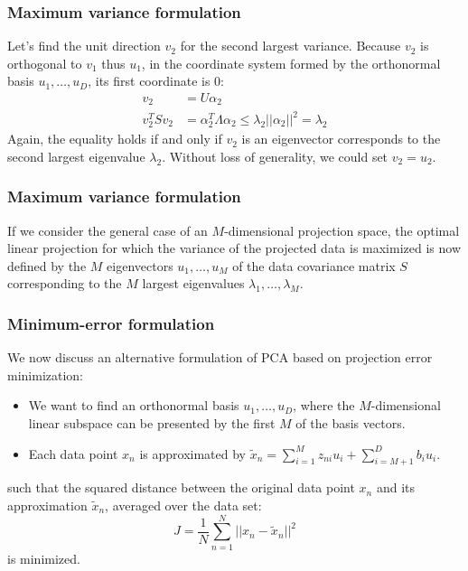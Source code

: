 \documentclass{beamer}
\begin{document}
\begin{frame}
    \frametitle{Maximum variance formulation}
    Let's find the unit direction $v_{2}$ for the second largest variance. Because $v_{2}$ is orthogonal to $v_{1}$ thus $u_{1}$, in the coordinate system formed by the orthonormal basis $u_{1},\hdots,u_{D}$, its first coordinate is $0$:
    \begin{align*}
        v_{2}&=U\alpha_{2} \\
        v_{2}^{T}Sv_{2}&=\alpha_{2}^{T}\Lambda\alpha_{2}\le\lambda_{2}||\alpha_{2}||^{2}=\lambda_{2}
    \end{align*}
    Again, the equality holds if and only if $v_{2}$ is an eigenvector corresponds to the second largest eigenvalue $\lambda_{2}$. Without loss of generality, we could set $v_{2}=u_{2}$.
\end{frame}

\begin{frame}
    \frametitle{Maximum variance formulation}
    If we consider the general case of an $M$-dimensional projection space, the optimal linear projection for which the variance of the projected data is maximized is now defined by the $M$ eigenvectors $u_{1},\hdots,u_{M}$ of the data covariance matrix $S$ corresponding to the $M$ largest eigenvalues $\lambda_{1},\hdots,\lambda_{M}$.
\end{frame}

\begin{frame}
    \frametitle{Minimum-error formulation}
    We now discuss an alternative formulation of PCA based on projection error minimization:
    \begin{itemize}
        \item We want to find an orthonormal basis $u_{1},\hdots,u_{D}$, where the $M$-dimensional linear subspace can be presented by the first $M$ of the basis vectors.
        \item Each data point $x_{n}$ is approximated by $\tilde{x}_{n}=\sum_{i=1}^{M}z_{ni}u_{i}+\sum_{i=M+1}^{D}b_{i}u_{i}$.
    \end{itemize}
    such that the squared distance between the original data point $x_{n}$ and its approximation $\tilde{x}_{n}$, averaged over the data set:
    \begin{equation*}
        J=\frac{1}{N}\sum_{n=1}^{N}||x_{n}-\tilde{x}_{n}||^{2}
    \end{equation*}
    is minimized.
\end{frame}
\end{document}
